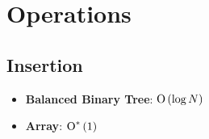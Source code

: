 \section{Operations}

\subsection{Insertion}

  \begin{itemize}
    \item \textbf{Balanced Binary Tree}: $ \operatorname{O}\left( \log N \right) $
    \item \textbf{Array}: $ \operatorname{O}^{*}\left( 1 \right) $
  \end{itemize}
